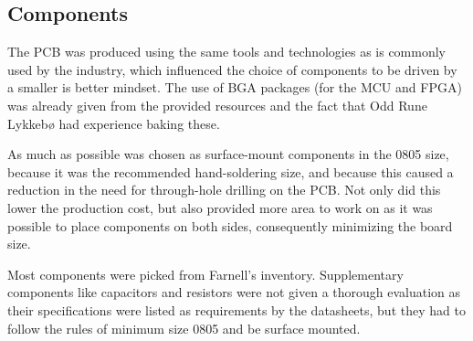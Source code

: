 
\subsection{Components}

The PCB was produced using the same tools and technologies as is
commonly used by the industry, which influenced the choice of
components to be driven by a smaller is better mindset. The use
of BGA packages (for the MCU and FPGA) was already given from
the provided resources and the fact that Odd Rune Lykkebø had
experience baking these.

As much as possible was chosen as surface-mount components in
the 0805 size, because it was the recommended hand-soldering
size, and because this caused a reduction in the need for
through-hole drilling on the PCB. Not only did this lower the
production cost, but also provided more area to work on as it
was possible to place components on both sides, consequently
minimizing the board size.

Most components were picked from Farnell's inventory.
Supplementary components like capacitors and resistors were not
given a thorough evaluation as their specifications were listed
as requirements by the datasheets, but they had to follow the
rules of minimum size 0805 and be surface mounted.







